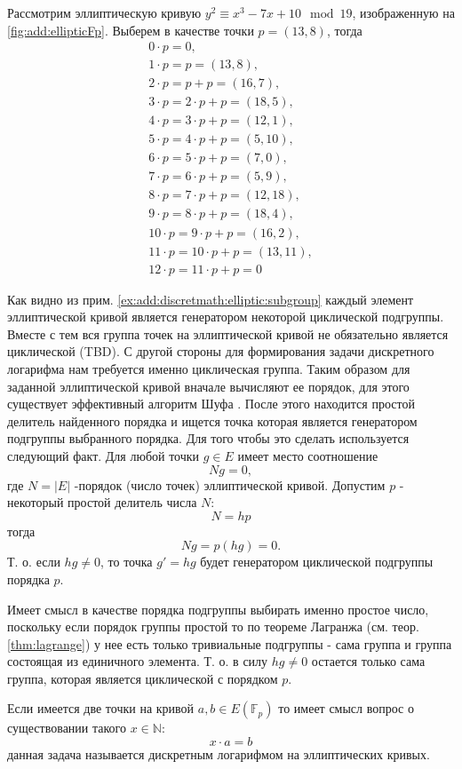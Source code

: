 \begin{example}
Рассмотрим эллиптическую кривую $y^2 \equiv x^3 -7
x + 10 \mod 19$, изображенную на \autoref{fig:add:ellipticFp}. Выберем
в качестве точки $p = (13, 8)$, тогда 
\begin{eqnarray}
0 \cdot p = 0, \nonumber \\
1 \cdot p = p = (13,8), \nonumber \\
2 \cdot p = p + p = (16,7), \nonumber \\
3 \cdot p = 2 \cdot p + p = (18,5), \nonumber \\
4 \cdot p = 3 \cdot p + p = (12,1), \nonumber \\
5 \cdot p = 4 \cdot p + p = (5,10), \nonumber \\
6 \cdot p = 5 \cdot p +p = (7,0), \nonumber \\
7 \cdot p = 6 \cdot p + p = (5,9), \nonumber \\
8 \cdot p = 7 \cdot p +p = (12,18), \nonumber \\
9 \cdot p = 8 \cdot p + p = (18,4), \nonumber \\
10 \cdot p = 9 \cdot p + p = (16,2), \nonumber \\
11 \cdot p = 10 \cdot p + p = (13,11), \nonumber \\
12 \cdot p = 11 \cdot p + p = 0
\nonumber 
\end{eqnarray}
\label{ex:add:discretmath:elliptic:subgroup}
\end{example}
Как видно из прим. \ref{ex:add:discretmath:elliptic:subgroup} каждый
элемент эллиптической кривой является генератором некоторой
циклической подгруппы. Вместе с тем вся группа точек на эллиптической
кривой не обязательно является циклической 
(TBD).
С другой стороны для формирования задачи дискретного логарифма нам
требуется именно циклическая группа. Таким образом для заданной
эллиптической кривой вначале вычисляют ее порядок, для этого
существует эффективный алгоритм Шуфа \cite{ReneSchoof:1985}. После
этого находится простой делитель найденного порядка и ищется точка
которая является генератором подгруппы выбранного порядка. Для того
чтобы это сделать используется следующий факт. Для любой точки 
$g \in E$ имеет место соотношение
\[
N g = 0,
\]
где $N = \left|E\right|$ -порядок (число точек) эллиптической кривой.
Допустим $p$ - некоторый простой делитель числа $N$:
\[
N = h p
\]
тогда
\[
N g = p \left( h g \right) = 0.
\]
Т. о. если $hg \ne 0$, то точка $g' = h g$ будет генератором
циклической подгруппы порядка $p$.
\begin{remark}
Имеет смысл в качестве порядка подгруппы выбирать именно простое
число, поскольку если порядок группы простой то по теореме Лагранжа
(см. теор. \ref{thm:lagrange})  у нее есть
только тривиальные подгруппы - сама группа и группа состоящая из
единичного элемента. Т. о. в силу $hg \ne 0$ остается только сама
группа, которая является циклической с порядком $p$. 
\end{remark}

Если имеется две точки на кривой $a, b \in E\left(\mathbb{F}_p\right)$
то имеет смысл вопрос о существовании такого $x \in \mathbb{N}$:
\[
x \cdot a = b
\]
данная задача называется дискретным логарифмом на эллиптических
кривых. 

